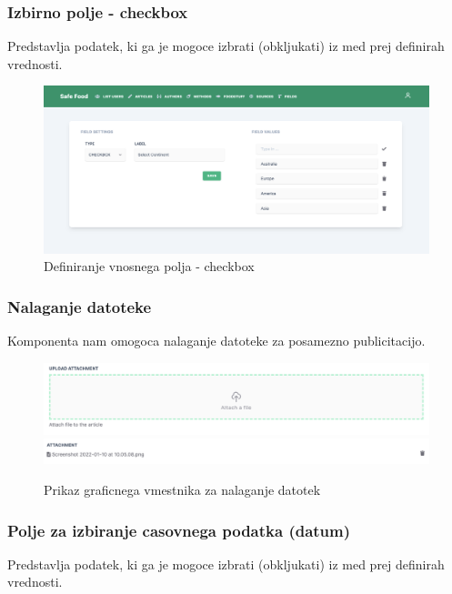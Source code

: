 \documentclass[a4paper, 12pt]{book}
\begin{document}
\subsubsection{Izbirno polje - checkbox}
Predstavlja podatek, ki ga je mogoce izbrati (obkljukati) iz med prej definirah vrednosti. 

\begin{figure}[h]
\begin{center}
\includegraphics[width=1\textwidth]{slike/type_checkbox.png}
\end{center}
\caption{ Definiranje vnosnega polja - checkbox }
\label{type-checkbox}
\end{figure}


\subsubsection{Nalaganje datoteke}
Komponenta nam omogoca nalaganje datoteke za posamezno publicitacijo.

\begin{figure}[h]
\begin{center}
\includegraphics[width=1\textwidth]{slike/upload_file_zone.png}
\includegraphics[width=1\textwidth]{slike/upload_file_list.png}
\end{center}
\caption{ Prikaz graficnega vmestnika za nalaganje datotek }
\label{type-checkbox}
\end{figure}

\subsubsection{Polje za izbiranje casovnega podatka (datum)}
Predstavlja podatek, ki ga je mogoce izbrati (obkljukati) iz med prej definirah vrednosti. 
\end{document}
